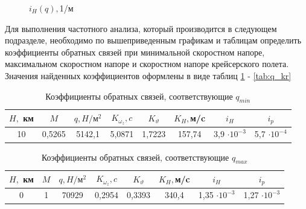 \begin{figure}[H]
        \caption{$i_H(q), $1/м}
        \label{fig:i_H}
    \end{figure} 
    

Для выполнения частотного анализа, который производится в следующем подразделе, необходимо по вышеприведенным графикам и таблицам определить коэффициенты обратных связей при минимальной скоростном напоре, максимальном скоростном напоре и скоростном напоре крейсерского полета. Значения найденных коэффициентов оформлены в виде таблиц \ref{tab:q_min} - \ref{tab:q_kr}


\begin{table}[H]
    \centering
    \caption{Коэффициенты обратных связей, соответствующие $q_{min}$}
    \begin{tabular}{|c|c|c|c|c|c|c|c|}
    \hline
        $H,$ км & $M$ & $q, H / \text{м}^2$ & $K_{\omega_z}, c$ & $K_\vartheta$ & $K_H,$м/c &$i_H$&$i_p$\\ \hline
        10& 0,5265& 5142,1 & 5,0871 &1,7223 & 157,74&3,9 $\cdot 10^{-3}$&5,7 $\cdot 10^{-4}$\\ \hline
    \end{tabular}
    \label{tab:q_min}
\end{table}

\begin{table}[H]
    \centering
    \caption{Коэффициенты обратных связей, соответствующие $q_{max}$}
    \begin{tabular}{|c|c|c|c|c|c|c|c|}
    \hline
        $H,$ км & $M$ & $q, H / \text{м}^2$ & $K_{\omega_z}, c$ & $K_\vartheta$ & $K_H,$м/c &$i_H$&$i_p$ \\ \hline
        0& 1 &70929 & 0,2954 & 0,3393&340,4&1,35 $\cdot 10^{-3}$&1,27 $\cdot 10^{-3}$\\ \hline
    \end{tabular}
    \label{tab:q_max}
\end{table}


